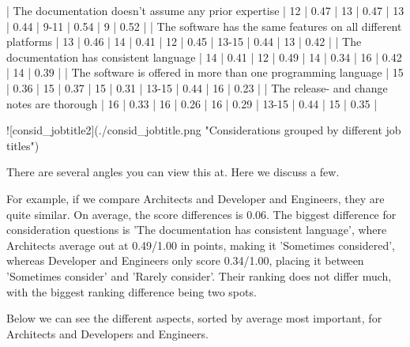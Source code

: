 \documentclass[11pt]{article}
\begin{document}
\begin{multicols}{2}
    | The documentation doesn't assume any prior expertise                  |            12 | 0.47         |        13 | 0.47       |           13 | 0.44       |     9-11 | 0.54     |          9 | 0.52  |
    | The software has the same features on all different platforms         |            13 | 0.46         |        14 | 0.41       |           12 | 0.45       |    13-15 | 0.44     |         13 | 0.42  |
    | The documentation has consistent language                             |            14 | 0.41         |        12 | 0.49       |           14 | 0.34       |       16 | 0.42     |         14 | 0.39  |
    | The software is offered in more than one programming language         |            15 | 0.36         |        15 | 0.37       |           15 | 0.31       |    13-15 | 0.44     |         16 | 0.23  |
    | The release- and change notes are thorough                            |            16 | 0.33         |        16 | 0.26       |           16 | 0.29       |    13-15 | 0.44     |         15 | 0.35  |

    ![consid_jobtitle2](./consid_jobtitle.png "Considerations grouped by different job titles")

    There are several angles you can view this at. Here we discuss a few.


    For example, if we compare Architects and Developer and Engineers, they
    are quite similar. On average, the score differences is 0.06. The
    biggest difference for consideration questions is 'The documentation has
    consistent language', where Architects average out at 0.49/1.00 in
    points, making it 'Sometimes considered', whereas Developer and
    Engineers only score 0.34/1.00, placing it between 'Sometimes consider'
    and 'Rarely consider'. Their ranking does not differ much, with the
    biggest ranking difference being two spots.

    Below we can see the different aspects, sorted by average most
    important, for Architects and Developers and Engineers.


\end{multicols}
\end{document}

